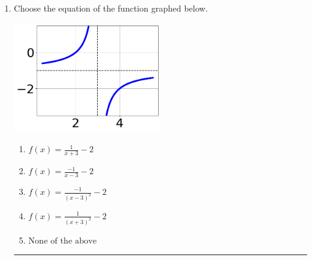 \documentclass[14pt]{extbook}
\newcommand{\litem}[1]{\item#1\hspace*{-1cm}\rule{\textwidth}{0.4pt}}
\begin{document}
\begin{enumerate}
{\begin{enumerate}[label=\Alph*.]
\end{enumerate} }
\litem{
Choose the equation of the function graphed below.
\begin{center}
    \includegraphics[width=0.5\textwidth]{../Figures/rationalGraphToEquationA.png}
\end{center}
\begin{enumerate}[label=\Alph*.]
\item \( f(x) = \frac{1}{x + 3} - 2 \)
\item \( f(x) = \frac{-1}{x - 3} - 2 \)
\item \( f(x) = \frac{-1}{(x - 3)^2} - 2 \)
\item \( f(x) = \frac{1}{(x + 3)^2} - 2 \)
\item \( \text{None of the above} \)

\end{enumerate} }
\end{enumerate}
\end{document}
